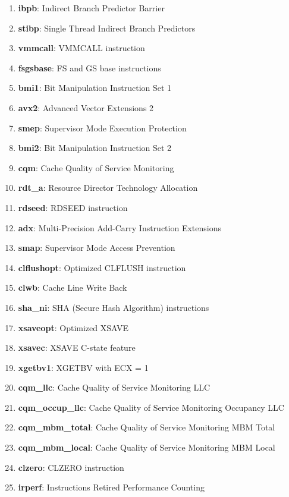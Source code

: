 \begin{multicols}{2}
\begin{enumerate}
        \item \textbf{ibpb}: Indirect Branch Predictor Barrier
        \item \textbf{stibp}: Single Thread Indirect Branch Predictors
        \item \textbf{vmmcall}: VMMCALL instruction
        \item \textbf{fsgsbase}: FS and GS base instructions
        \item \textbf{bmi1}: Bit Manipulation Instruction Set 1
        \item \textbf{avx2}: Advanced Vector Extensions 2
        \item \textbf{smep}: Supervisor Mode Execution Protection
        \item \textbf{bmi2}: Bit Manipulation Instruction Set 2
        \item \textbf{cqm}: Cache Quality of Service Monitoring
        \item \textbf{rdt\_a}: Resource Director Technology Allocation
        \item \textbf{rdseed}: RDSEED instruction
        \item \textbf{adx}: Multi-Precision Add-Carry Instruction Extensions
        \item \textbf{smap}: Supervisor Mode Access Prevention
        \item \textbf{clflushopt}: Optimized CLFLUSH instruction
        \item \textbf{clwb}: Cache Line Write Back
        \item \textbf{sha\_ni}: SHA (Secure Hash Algorithm) instructions
        \item \textbf{xsaveopt}: Optimized XSAVE
        \item \textbf{xsavec}: XSAVE C-state feature
        \item \textbf{xgetbv1}: XGETBV with ECX = 1
        \item \textbf{cqm\_llc}: Cache Quality of Service Monitoring LLC
        \item \textbf{cqm\_occup\_llc}: Cache Quality of Service Monitoring Occupancy LLC
        \item \textbf{cqm\_mbm\_total}: Cache Quality of Service Monitoring MBM Total
        \item \textbf{cqm\_mbm\_local}: Cache Quality of Service Monitoring MBM Local
        \item \textbf{clzero}: CLZERO instruction
        \item \textbf{irperf}: Instructions Retired Performance Counting

\end{enumerate}
\end{multicols}
